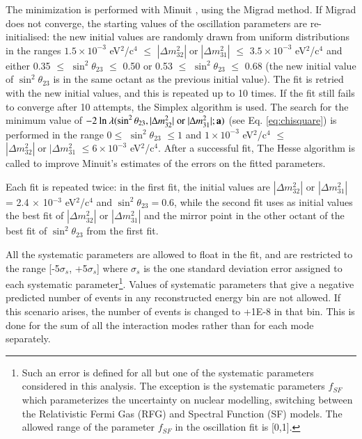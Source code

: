 The minimization is performed with Minuit \cite{Minuit}, using the Migrad method.
If Migrad does not converge, the starting values of the oscillation parameters are re-initialised:
the new initial values are randomly drawn from uniform distributions in the ranges 
$1.5 \times 10^{-3}$ eV$^{2}$/c$^{4}$ $\leq$ $|\Delta m^{2}_{32}| \; \textrm{or} \; |\Delta m^{2}_{31}|$ $\leq$ $3.5 \times 10^{-3}$  eV$^{2}$/c$^{4}$ and
either 0.35 $\leq$ $\sin^{2}\theta_{23}$ $\leq$ 0.50 or 0.53 $\leq$ $\sin^{2}\theta_{23}$ $\leq$ 0.68 (the new initial value of 
$\sin^{2}\theta_{23}$ is in the same octant as the previous initial value).  
The fit is retried with the new initial values, and this is repeated up to 10 times.
If the fit still fails to converge after 10 attempts, the Simplex algorithm is used.
The search for the minimum value of 
$-2 \: \textrm{ln} \: \lambda(\sin^{2}\theta_{23},|\Delta m^ {2}_{32}| \; \textrm{or} \; |\Delta m^{2}_{31}|; {\bf a})$ (see Eq. \ref{eq:chisquare}) 
is performed in the range 
$0 \leq$ $\sin^{2}\theta_{23}$ $\leq 1$ and
$1 \times 10^{-3}$ eV$^{2}$/c$^{4}$ $\leq$ $|\Delta m^{2}_{32}| \; \textrm{or} \; |\Delta m^{2}_{31}$ $\leq 6 \times 10^{-3}$ eV$^{2}$/c$^{4}$.
After a successful fit, The Hesse algorithm is called to improve Minuit's estimates of the
errors on the fitted parameters.

Each fit is repeated twice: in the first fit, the initial values are $|\Delta m^{2}_{32}|$ or $|\Delta m^{2}_{31}|$ = 2.4 $\times$ 10$^{-3}$ 
eV$^{2}$/c$^{4}$ and $\sin^{2}\theta_{23} = 0.6$, while the second fit uses as initial values the best fit of $|\Delta m^{2}_{32}|$ or $|\Delta m^{2}_{31}|$ 
and the mirror point in the other octant of the best fit of $\sin^{2}\theta_{23}$ from the first fit. 

All the systematic parameters are allowed to float in the fit, and are restricted to the range [-5$\sigma_{s}$, +5$\sigma_{s}$]
where $\sigma_{s}$ is the one standard deviation error assigned to each systematic parameter\footnote{
 Such an error is defined for all but one of the systematic parameters considered in this analysis. 
 The exception is the systematic parameters $f_{SF}$ which parameterizes the uncertainty on nuclear modelling,
 switching between the Relativistic Fermi Gas (RFG) and Spectral Function (SF) models. The allowed range of the parameter $f_{SF}$ 
 in the oscillation fit is [0,1].}.
Values of systematic parameters that give a negative predicted number of events in any reconstructed energy bin are not allowed. 
If this scenario arises, the number of events is changed to +1E-8 in that bin. This is done for the sum of all the interaction 
modes rather than for each mode separately.

